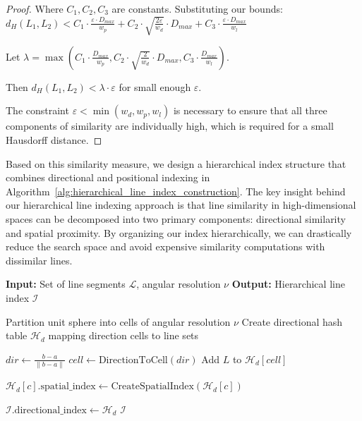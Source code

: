 \documentclass[numbers,sort]{article}
\begin{document}
\begin{proof}
Where $C_1, C_2, C_3$ are constants. Substituting our bounds:
$d_H(L_1, L_2) < C_1 \cdot \frac{\varepsilon \cdot D_{max}}{w_p} + C_2 \cdot \sqrt{\frac{2\varepsilon}{w_d}} \cdot D_{max} + C_3 \cdot \frac{\varepsilon \cdot D_{max}}{w_l}$

Let $\lambda = \max\left(C_1 \cdot \frac{D_{max}}{w_p}, C_2 \cdot \sqrt{\frac{2}{w_d}} \cdot D_{max}, C_3 \cdot \frac{D_{max}}{w_l}\right)$.

Then $d_H(L_1, L_2) < \lambda \cdot \varepsilon$ for small enough $\varepsilon$.

The constraint $\varepsilon < \min(w_d, w_p, w_l)$ is necessary to ensure that all three components of similarity are individually high, which is required for a small Hausdorff distance.
\end{proof}

Based on this similarity measure, we design a hierarchical index structure that combines directional and positional indexing in Algorithm~\ref{alg:hierarchical_line_index_construction}. The key insight behind our hierarchical line indexing approach is that line similarity in high-dimensional spaces can be decomposed into two primary components: directional similarity and spatial proximity. By organizing our index hierarchically, we can drastically reduce the search space and avoid expensive similarity computations with dissimilar lines.

\begin{algorithm}[ht]
\caption{Hierarchical Line Index Construction}
\label{alg:hierarchical_line_index_construction}
\begin{algorithmic}[1]
\STATE \textbf{Input:} Set of line segments $\mathcal{L}$, angular resolution $\nu$
\STATE \textbf{Output:} Hierarchical line index $\mathcal{I}$

\STATE {}
\STATE Partition unit sphere into cells of angular resolution $\nu$
\STATE Create directional hash table $\mathcal{H}_d$ mapping direction cells to line sets

    \STATE $dir \leftarrow \frac{b-a}{\|b-a\|}$ 
    \STATE $cell \leftarrow \text{DirectionToCell}(dir)$ 
    \STATE Add $L$ to $\mathcal{H}_d[cell]$
\ENDFOR

\STATE {}
    \STATE $\mathcal{H}_d[c].\text{spatial\_index} \leftarrow \text{CreateSpatialIndex}(\mathcal{H}_d[c])$
\ENDFOR

\STATE $\mathcal{I}.\text{directional\_index} \leftarrow \mathcal{H}_d$
\RETURN $\mathcal{I}$
\end{algorithmic}
\end{algorithm}
\end{document}

